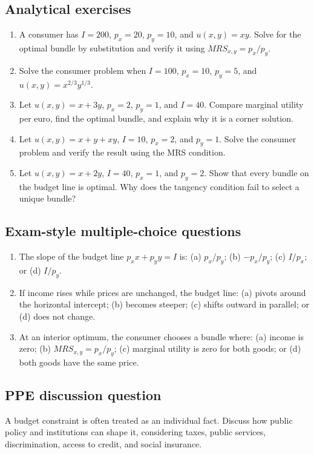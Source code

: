 \subsection*{Analytical exercises}
\begin{enumerate}[resume,label=\arabic*.]
  \item A consumer has $I=200$, $p_x=20$, $p_y=10$, and $u(x,y)=xy$. Solve for the optimal bundle by substitution and verify it using $MRS_{x,y}=p_x/p_y$.
  \item Solve the consumer problem when $I=100$, $p_x=10$, $p_y=5$, and $u(x,y)=x^{2/3}y^{1/3}$.
  \item Let $u(x,y)=x+3y$, $p_x=2$, $p_y=1$, and $I=40$. Compare marginal utility per euro, find the optimal bundle, and explain why it is a corner solution.
  \item Let $u(x,y)=x+y+xy$, $I=10$, $p_x=2$, and $p_y=1$. Solve the consumer problem and verify the result using the MRS condition.
  \item Let $u(x,y)=x+2y$, $I=40$, $p_x=1$, and $p_y=2$. Show that every bundle on the budget line is optimal. Why does the tangency condition fail to select a unique bundle?
\end{enumerate}

\subsection*{Exam-style multiple-choice questions}
\begin{enumerate}[resume,label=\arabic*.]
  \item The slope of the budget line $p_xx+p_yy=I$ is: (a) $p_x/p_y$; (b) $-p_x/p_y$; (c) $I/p_x$; or (d) $I/p_y$.
  \item If income rises while prices are unchanged, the budget line: (a) pivots around the horizontal intercept; (b) becomes steeper; (c) shifts outward in parallel; or (d) does not change.
  \item At an interior optimum, the consumer chooses a bundle where: (a) income is zero; (b) $MRS_{x,y}=p_x/p_y$; (c) marginal utility is zero for both goods; or (d) both goods have the same price.
\end{enumerate}

\subsection*{PPE discussion question}

\noindent A budget constraint is often treated as an individual fact. Discuss how public policy and institutions can shape it, considering taxes, public services, discrimination, access to credit, and social insurance.
